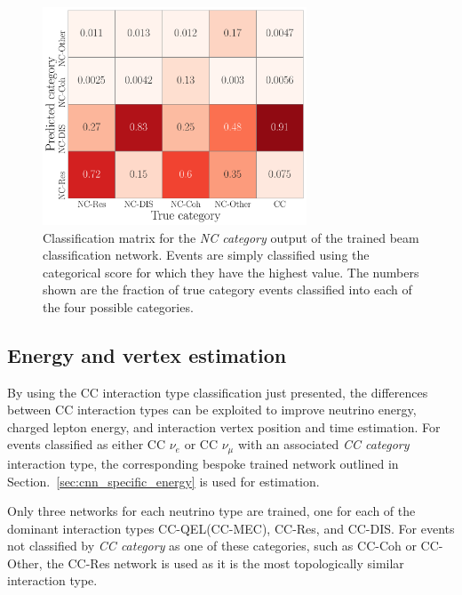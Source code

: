 \begin{figure} %
    \includegraphics[width=0.7\textwidth]{diagrams/7-results/final_nc_cat_confusion.pdf}
    \caption[Classification matrix for the NC category output of the beam classification network]
    {Classification matrix for the \emph{NC category} output of the trained beam classification
        network. Events are simply classified using the categorical score for which they have the
        highest value. The numbers shown are the fraction of true category events classified into
        each of the four possible categories.}
    \label{fig:final_nc_cat_confusion}
\end{figure}

\subsection{Energy and vertex estimation} %
\label{sec:results_eval_energy} %

By using the CC interaction type classification just presented, the differences between CC
interaction types can be exploited to improve neutrino energy, charged lepton energy, and
interaction vertex position and time estimation. For events classified as either CC $\nu_{e}$ or
CC $\nu_{\mu}$ with an associated \emph{CC category} interaction type, the corresponding bespoke
trained network outlined in Section.~\ref{sec:cnn_specific_energy} is used for estimation.

Only three networks for each neutrino type are trained, one for each of the dominant interaction
types CC-QEL(CC-MEC), CC-Res, and CC-DIS. For events not classified by \emph{CC category} as one
of these categories, such as CC-Coh or CC-Other, the CC-Res network is used as it is the most
topologically similar interaction type.

